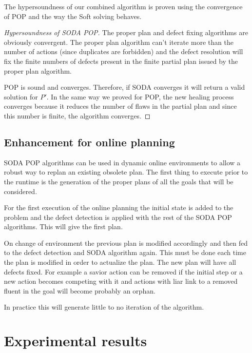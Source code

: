 \documentclass[]{article}
\begin{document}
The hypersoundness of our combined algorithm is proven using the
convergence of POP and the way the Soft solving behaves.

\begin{proof}[Hypersoundness of SODA POP]

The proper plan and defect fixing algorithms are obviously convergent.
The proper plan algorithm can't iterate more than the number of actions
(since duplicates are forbidden) and the defect resolution will fix the
finite numbers of defects present in the finite partial plan issued by
the proper plan algorithm.

POP is sound and converges. Therefore, if SODA converges it will return
a valid solution for \(P'\). In the same way we proved for POP, the new
healing process converges because it reduces the number of flaws in the
partial plan and since this number is finite, the algorithm converges.

\end{proof}

\subsection{Enhancement for online
planning}\label{enhancement-for-online-planning}

SODA POP algorithms can be used in dynamic online environments to allow
a robust way to replan an existing obsolete plan. The first thing to
execute prior to the runtime is the generation of the proper plans of
all the goals that will be considered.

For the first execution of the online planning the initial state is
added to the problem and the defect detection is applied with the rest
of the SODA POP algorithms. This will give the first plan.

On change of environment the previous plan is modified accordingly and
then fed to the defect detection and SODA algorithm again. This must be
done each time the plan is modified in order to actualize the plan. The
new plan will have all defects fixed. For example a savior action can be
removed if the initial step or a new action becomes competing with it
and actions with liar link to a removed fluent in the goal will become
probably an orphan.

In practice this will generate little to no iteration of the algorithm.

\section{Experimental results}\label{experimental-results}
\end{document}
